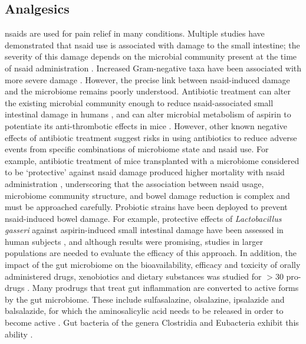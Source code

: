 \subsection{Analgesics}
\Glspl{nsaid} are used for pain relief in many conditions. Multiple studies have demonstrated that \gls{nsaid} use is associated with damage to the small intestine; the severity of this damage depends on the microbial community present at the time of \gls{nsaid} administration \cite{RN4107, RN4109}. Increased Gram-negative taxa have been associated with more severe damage \cite{RN4109, RN4124}. However, the precise link between \gls{nsaid}-induced damage and the microbiome remains poorly understood. Antibiotic treatment can alter the existing microbial community enough to reduce \gls{nsaid}-associated small intestinal damage in humans \cite{RN4085}, and can alter microbial metabolism of aspirin to potentiate its anti-thrombotic effects in mice \cite{RN4090}. However, other known negative effects of antibiotic treatment suggest risks in using antibiotics to reduce adverse events from specific combinations of microbiome state and \gls{nsaid} use. For example, antibiotic treatment of mice transplanted with a microbiome considered to be `protective' against \gls{nsaid} damage produced higher mortality with \gls{nsaid} administration \cite{RN4089}, underscoring that the association between \gls{nsaid} usage, microbiome community structure, and bowel damage reduction is complex and must be approached carefully. Probiotic strains have been deployed to prevent \gls{nsaid}-induced bowel damage. For example, protective effects of \textit{Lactobacillus gasseri} against aspirin-induced small intestinal damage have been assessed in human subjects \cite{RN4091}, and although results were promising, studies in larger populations are needed to evaluate the efficacy of this approach. In addition, the impact of the gut microbiome on the bioavailability, efficacy and toxicity of orally administered drugs, xenobiotics and dietary substances was studied for $>$30 pro-drugs \cite{RN4136}. Many prodrugs that treat gut inflammation are converted to active forms by the gut microbiome. These include sulfasalazine, olsalazine, ipsalazide and balsalazide, for which the aminosalicylic acid needs to be released in order to become active \cite{RN4093}. Gut bacteria of the genera Clostridia and Eubacteria exhibit this ability \cite{RN4094}.

